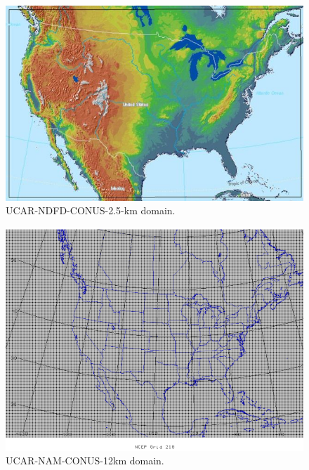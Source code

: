 \documentclass[12pt]{article}
\begin{document}
\begin{figure}[H]
	\centering
	\label{UCAR_NDFD_Domain}
	\includegraphics[scale=1.0]{NDFD_domain}
	\caption*{UCAR-NDFD-CONUS-2.5-km domain.}
\end{figure}
\begin{figure}[H]
	\centering
	\label{UCAR_NDFD_Domain}
	\includegraphics[scale=0.30]{NAM_1}
	\caption*{UCAR-NAM-CONUS-12km domain.}
\end{figure}
\end{document}
